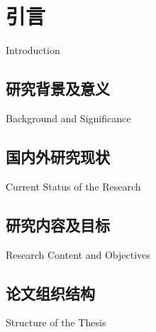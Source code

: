 
\chapter{引言}{Introduction}


\section{研究背景及意义}{Background and Significance}
\somewords


\section{国内外研究现状}{Current Status of the Research}
\somewords


\section{研究内容及目标}{Research Content and Objectives}
\somewords


\section{论文组织结构}{Structure of the Thesis}
\somewords


\newpage
